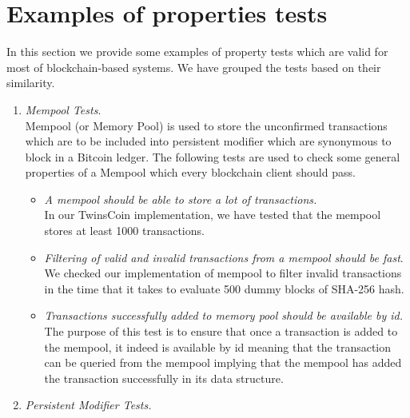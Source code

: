 
\section{Examples of properties tests}
In this section we provide some examples of property tests which are valid for most of blockchain-based systems. We have grouped the tests based on their similarity.

\begin{enumerate}[\IEEEsetlabelwidth{Z}]
\item \textit{Mempool Tests}.\\
Mempool (or Memory Pool) is used to store the unconfirmed transactions which are to be included into persistent modifier which are synonymous to block in a Bitcoin ledger. The following tests are used to check some general properties of a Mempool which every blockchain client should pass.
\begin{itemize}[]
\item \textit{A mempool should be able to store a lot of transactions.}\\
In our TwinsCoin implementation, we have tested that the mempool stores at least 1000 transactions.
\item \textit{Filtering of valid and invalid transactions from a mempool should be fast}.\\
We checked our implementation of mempool to filter invalid transactions in the time that it takes to evaluate 500 dummy blocks of SHA-256 hash.
\item \textit{Transactions successfully added to memory pool should be available by id.}\\
The purpose of this test is to ensure that once a transaction is added to the mempool, it indeed is available by id meaning that the transaction can be queried from the mempool implying that the mempool has added the transaction successfully in its data structure.
\end{itemize}

\item \textit{Persistent Modifier Tests.}\\


\end{enumerate}
